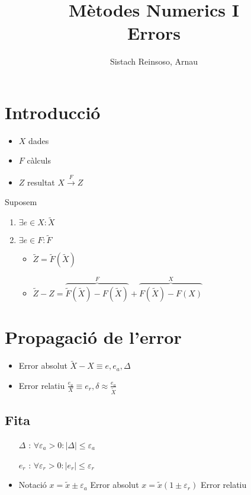 \documentclass{article}
\title{Mètodes Numerics I\\ Errors}
\author{Sistach Reinsoso, Arnau}
\begin{document}
\maketitle
\tableofcontents

\section{Introducció}
\begin{itemize}
\item $X$ dades
\item $F$ càlculs
\item $Z$ resultat
	\subitem $X \xrightarrow{F} Z$
\end{itemize}

Suposem
\begin{enumerate}
\item $\exists e \in X: \widetilde{X}$
\item $\exists e \in F: \widetilde{F}$
	\begin{itemize}
	\item $\widetilde{Z} = \widetilde{F} (\widetilde{X})$
	\item $\widetilde{Z} - Z =
		\overbrace{\widetilde{F}(\widetilde{X}) -
			F(\widetilde{X})}^F +
		\overbrace{F(\widetilde{X}) - F(X)}^X$
	\end{itemize}
\end{enumerate}


\section{Propagació de l'error}
\begin{itemize}
\item Error absolut
	\subitem $\widetilde{X} - X \equiv e, e_a, \Delta$
\item Error relatiu
	\subitem $\frac{e_a}{X} \equiv e_r, \delta \approx \frac{e_a}{\widetilde{X}}$
\end{itemize}
\subsection{Fita}
\begin{itemize}
\item[$\Delta$]: $\forall \varepsilon_a > 0: |\Delta| \le \varepsilon_a$
\item[$e_r$]: $\forall \varepsilon_r > 0: |e_r| \le \varepsilon_r$
\item Notació
	\subitem $x = \tilde{x} \pm \varepsilon_a$ Error absolut
	\subitem $x = \tilde{x} (1 \pm \varepsilon_r)$ Error relatiu
\end{itemize}
\end{document}
